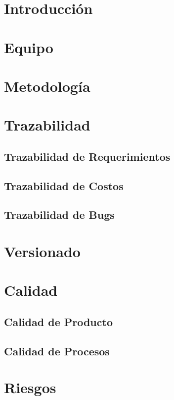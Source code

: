 \documentclass[a4paper,11pt]{article}
\begin{document}

\section{Introducción}
\baselineskip=18pt

\section{Equipo}

\section{Metodología}

\section{Trazabilidad}

\subsection{Trazabilidad de Requerimientos}

\subsection{Trazabilidad de Costos}

\subsection{Trazabilidad de Bugs}

\section{Versionado}

\section{Calidad}

\subsection{Calidad de Producto}

\subsection{Calidad de Procesos}

\section{Riesgos}
\end{document}
